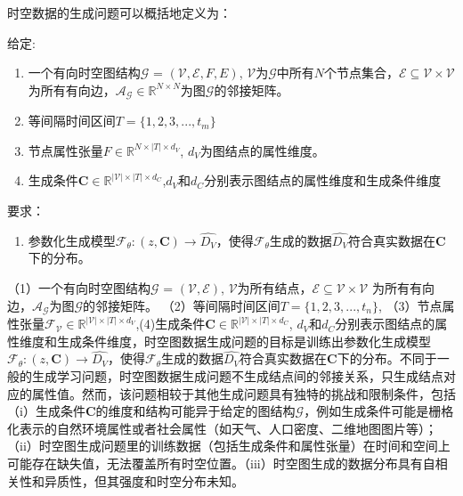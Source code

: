 \documentclass[12pt,UTF8,AutoFakeBold=2,a4paper]{ctexart} %
\begin{document}
时空数据的生成问题可以概括地定义为：
\begin{itemized}
    \item 给定:
    \begin{enumerate}
        \item 一个有向时空图结构$\mathcal{G}$ = $(\mathcal{V}, \mathcal{E}, F, E)$, $\mathcal{V}$为$\mathcal{G}$中所有$N$个节点集合，$\mathcal{E} \subseteq \mathcal{V}\times \mathcal{V}$ 为所有有向边，$\mathcal{A_G}\in \mathbb{R}^{N\times N}$为图$\mathcal{G}$的邻接矩阵。
        \item 等间隔时间区间$T = \{1,2,3,...,t_m\}$
        \item 节点属性张量$F \in \mathbb{R}^{N\times|T|\times d_V}$, $d_V$为图结点的属性维度。
        \item 生成条件$\mathbf{C} \in \mathbb{R}^{|\mathcal{V}|\times|T|\times d_C}$,$d_V$和$d_C$分别表示图结点的属性维度和生成条件维度
    \end{enumerate}
    \item 要求：
        \begin{enumerate}
        \item 参数化生成模型$\mathcal{F_\theta}: (z, \mathbf{C}) \rightarrow \hat{D_V}$，使得$\mathcal{F_\theta}$生成的数据$\hat{D_V}$符合真实数据在$\mathbf{C}$下的分布。
    \end{enumerate}
\end{itemized}

（1）一个有向时空图结构$\mathcal{G}$ = $\mathcal{(V, E)}$, $\mathcal{V}$为所有结点，$\mathcal{E} \subseteq \mathcal{V}\times \mathcal{V}$ 为所有有向边，$\mathcal{A_G}$为图$\mathcal{G}$的邻接矩阵。
（2）等间隔时间区间$T = \{1,2,3,...,t_n\}$, （3）节点属性张量$\mathcal{F_V} \in \mathbb{R}^{|\mathcal{V}|\times|T|\times d_V}$,(4)生成条件$\mathbf{C} \in \mathbb{R}^{|\mathcal{V}|\times|T|\times d_C}$, %
$d_V$和$d_C$分别表示图结点的属性维度和生成条件维度，时空图数据生成问题的目标是训练出参数化生成模型$\mathcal{F_\theta}: (z, \mathbf{C}) \rightarrow \hat{D_V}$，使得$\mathcal{F_\theta}$生成的数据$\hat{D_V}$符合真实数据在$\mathbf{C}$下的分布。不同于一般的生成学习问题，时空图数据生成问题不生成结点间的邻接关系，只生成结点对应的属性值。然而，该问题相较于其他生成问题具有独特的挑战和限制条件，包括（i）生成条件$\mathbf{C}$的维度和结构可能异于给定的图结构$\mathcal{G}$，例如生成条件可能是栅格化表示的自然环境属性或者社会属性（如天气、人口密度、二维地图图片等）；（ii）时空图生成问题里的训练数据（包括生成条件和属性张量）在时间和空间上可能存在缺失值，无法覆盖所有时空位置。（iii）时空图生成的数据分布具有自相关性和异质性，但其强度和时空分布未知。
\end{document}
